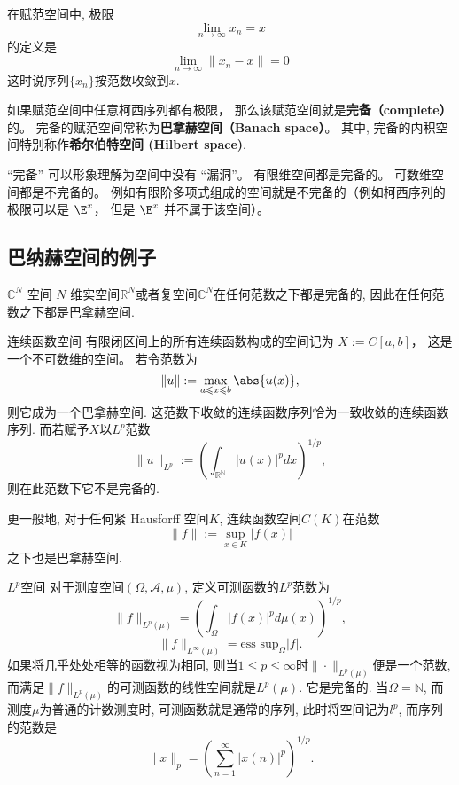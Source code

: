 
在赋范空间中, 极限
\begin{equation}
\lim_{n\to\infty} x_n = x
\end{equation}
的定义是
\begin{equation}
\lim_{n\to\infty} \|{x_n - x}\|= 0
\end{equation}
这时说序列$\{x_n\}$按范数收敛到$x$.

如果赋范空间中任意柯西序列都有极限， 那么该赋范空间就是\textbf{完备（complete）}的。 完备的赋范空间常称为\textbf{巴拿赫空间（Banach space）}。 其中, 完备的内积空间特别称作\textbf{希尔伯特空间 (Hilbert space)}.

“完备” 可以形象理解为空间中没有 “漏洞”。 有限维空间都是完备的。 可数维空间都是不完备的。 例如有限阶多项式组成的空间就是不完备的（例如柯西序列的极限可以是 $\E^x$， 但是 $\E^x$ 并不属于该空间）。

\subsection{巴纳赫空间的例子}
\begin{example}{$\mathbb C^N$ 空间}
$N$ 维实空间$\mathbb R^N$或者复空间$\mathbb C^N$在任何范数之下都是完备的, 因此在任何范数之下都是巴拿赫空间.
\end{example}

\begin{example}{连续函数空间}
有限闭区间上的所有连续函数构成的空间记为 $X := C[a, b]$， 这是一个不可数维的空间。 若令范数为
$$
\|{u}\|:= \max_{a \leqslant x \leqslant b} \abs{u(x)},
$$
则它成为一个巴拿赫空间. 这范数下收敛的连续函数序列恰为一致收敛的连续函数序列. 而若赋予$X$以$L^p$范数
$$
\|u\|_{L^p}:=\left(\int_{\mathbb{R^N}}|u(x)|^pdx\right)^{1/p},
$$
则在此范数下它不是完备的.

更一般地, 对于任何紧 Hausforff 空间$K$, 连续函数空间$C(K)$在范数
$$
\|f\|:=\sup_{x\in K}|f(x)|
$$
之下也是巴拿赫空间.
\end{example}

\begin{example}{$L^p$空间}
对于测度空间$(\Omega,\mathcal{A},\mu)$, 定义可测函数的$L^p$范数为
$$
\|f\|_{L^p(\mu)}=\left(\int_\Omega |f(x)|^pd\mu(x)\right)^{1/p},
$$
$$
\|f\|_{L^\infty(\mu)}=\text{ess sup}_{\Omega}|f|.
$$
如果将几乎处处相等的函数视为相同, 则当$1\leq p\leq\infty$时$\|\cdot\|_{L^p(\mu)}$便是一个范数, 而满足$\|f\|_{L^p(\mu)}$的可测函数的线性空间就是$L^p(\mu)$. 它是完备的. 当$\Omega=\mathbb{N}$, 而测度$\mu$为普通的计数测度时, 可测函数就是通常的序列, 此时将空间记为$l^p$, 而序列的范数是
$$
\|x\|_p=\left(\sum_{n=1}^\infty|x(n)|^p\right)^{1/p}.
$$
\end{example}

